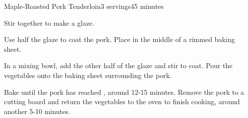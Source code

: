 \documentclass[../Cookbook.tex]{subfiles}
\begin{document}
\begin{recipe}[MapleRoastedPorkTenderloin]{Maple-Roasted Pork Tenderloin}{3 servings}{45 minutes}

Stir together to make a glaze.

Use half the glaze to coat the pork.
Place in the middle of a rimmed baking sheet.

In a mixing bowl, add the other half of the glaze and stir to coat.
Pour the vegetables onto the baking sheet surrounding the pork.

Bake until the pork has reached , around 12-15 minutes.
Remove the pork to a cutting board and return the vegetables to the oven to finish cooking, around another 5-10 minutes.

\end{recipe}
\end{document}
